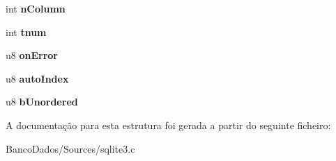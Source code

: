 \begin{DoxyCompactItemize}
\item 
\hypertarget{struct_index_ac583449830c285a52d1fd10b8c890162}{int {\bfseries n\-Column}}\label{struct_index_ac583449830c285a52d1fd10b8c890162}

\item 
\hypertarget{struct_index_af895a09c01701021c3e36362c04a1ae6}{int {\bfseries tnum}}\label{struct_index_af895a09c01701021c3e36362c04a1ae6}

\item 
\hypertarget{struct_index_ae8bf87d0414e5c46b86192cfbdd271a7}{u8 {\bfseries on\-Error}}\label{struct_index_ae8bf87d0414e5c46b86192cfbdd271a7}

\item 
\hypertarget{struct_index_a1fa09182749b6e07b2555d5b3dffb91d}{u8 {\bfseries auto\-Index}}\label{struct_index_a1fa09182749b6e07b2555d5b3dffb91d}

\item 
\hypertarget{struct_index_a1a3114080bcca1d9dd23ce5755d4e4e8}{u8 {\bfseries b\-Unordered}}\label{struct_index_a1a3114080bcca1d9dd23ce5755d4e4e8}

\end{DoxyCompactItemize}


A documentação para esta estrutura foi gerada a partir do seguinte ficheiro\-:\begin{DoxyCompactItemize}
\item 
Banco\-Dados/\-Sources/sqlite3.\-c\end{DoxyCompactItemize}
